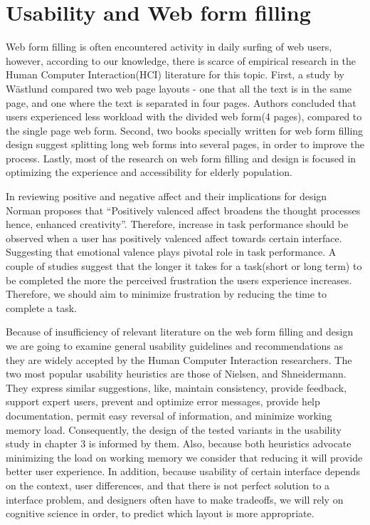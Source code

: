 \documentclass[a4paper]{report}
\begin{document}
	\section{Usability and Web form filling}	
		Web form filling is often encountered activity in daily surfing of web users, however, according to our knowledge, there is scarce of empirical research in the Human Computer Interaction(HCI) literature for this topic. First, a study by Wästlund\cite{Wastlund20081229} compared two web page layouts - one that all the text is in the same page, and one where the text is separated in four pages. Authors concluded that users experienced less workload with the divided web form(4 pages), compared to the single page web form. Second, two books specially written for web form filling design\cite{jarrett2009forms,wroblewski2008web} suggest splitting long web forms into several pages, in order to improve the process. Lastly, most of the research on web form filling and design is focused in optimizing the experience and accessibility for elderly population\cite{sayago2012selective,chadwick2003web,lines2006online,sayago2007some}.
		
		In reviewing positive and negative affect and their implications for design Norman\cite{norman2002emotion} proposes that ``Positively valenced affect broadens the thought processes hence, enhanced creativity''. Therefore, increase in task performance should be observed when a user has positively valenced affect towards certain interface. Suggesting that emotional valence plays pivotal role in task performance. A couple of studies suggest that the longer it takes for a task(short or long term) to be completed the more the perceived frustration the users experience increases\cite{mendoza2005usability,bessiere2004social}. Therefore, we should aim to minimize frustration by reducing the time to complete a task.
			
		Because of insufficiency of relevant literature on the web form filling and design we are going to examine general usability guidelines and recommendations as they are widely accepted by the Human Computer Interaction researchers. The two most popular usability heuristics are those of Nielsen\cite{nielsen1990heuristic}, and Shneidermann\cite{shneiderman1992designing}. They express similar suggestions, like, maintain consistency, provide feedback, support expert users, prevent and optimize error messages, provide help documentation, permit easy reversal of information, and minimize working memory load. Consequently, the design of the tested variants in the usability study in chapter 3 is informed by them. Also, because both heuristics advocate minimizing the load on working memory we consider that reducing it will provide better user experience. In addition, because usability of certain interface depends on the context, user differences, and that there is not perfect solution to a interface problem, and designers often have to make tradeoffs\cite{norman1986user}, we will rely on cognitive science in order, to predict which layout is more appropriate.
\end{document}
